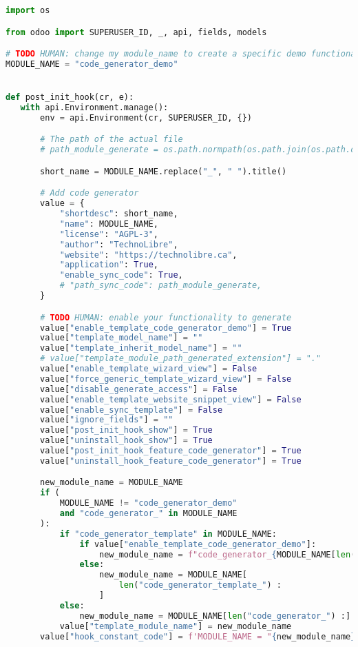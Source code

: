 
 \label{annexe_cg_code_uc0}

\begin{lstlisting}[language=Python, upquote=true]
import os

from odoo import SUPERUSER_ID, _, api, fields, models

# TODO HUMAN: change my module_name to create a specific demo functionality
MODULE_NAME = "code_generator_demo"


def post_init_hook(cr, e):
   with api.Environment.manage():
       env = api.Environment(cr, SUPERUSER_ID, {})

       # The path of the actual file
       # path_module_generate = os.path.normpath(os.path.join(os.path.dirname(__file__), '..'))

       short_name = MODULE_NAME.replace("_", " ").title()

       # Add code generator
       value = {
           "shortdesc": short_name,
           "name": MODULE_NAME,
           "license": "AGPL-3",
           "author": "TechnoLibre",
           "website": "https://technolibre.ca",
           "application": True,
           "enable_sync_code": True,
           # "path_sync_code": path_module_generate,
       }

       # TODO HUMAN: enable your functionality to generate
       value["enable_template_code_generator_demo"] = True
       value["template_model_name"] = ""
       value["template_inherit_model_name"] = ""
       # value["template_module_path_generated_extension"] = "."
       value["enable_template_wizard_view"] = False
       value["force_generic_template_wizard_view"] = False
       value["disable_generate_access"] = False
       value["enable_template_website_snippet_view"] = False
       value["enable_sync_template"] = False
       value["ignore_fields"] = ""
       value["post_init_hook_show"] = True
       value["uninstall_hook_show"] = True
       value["post_init_hook_feature_code_generator"] = True
       value["uninstall_hook_feature_code_generator"] = True

       new_module_name = MODULE_NAME
       if (
           MODULE_NAME != "code_generator_demo"
           and "code_generator_" in MODULE_NAME
       ):
           if "code_generator_template" in MODULE_NAME:
               if value["enable_template_code_generator_demo"]:
                   new_module_name = f"code_generator_{MODULE_NAME[len('code_generator_template_'):]}"
               else:
                   new_module_name = MODULE_NAME[
                       len("code_generator_template_") :
                   ]
           else:
               new_module_name = MODULE_NAME[len("code_generator_") :]
           value["template_module_name"] = new_module_name
       value["hook_constant_code"] = f'MODULE_NAME = "{new_module_name}"'


\end{lstlisting}
